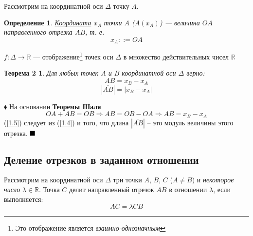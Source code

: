 \documentclass[a4paper, 12pt]{report}
\begin{document}
	Рассмотрим на координатной оси $\Delta$ точку $A$.
	\newtheorem*{Def2}{Определение}
	\begin{Def2}
		\underline{Координата} $x_A$ точки $A$ ($A(x_A)$) --- величина $OA$ направленного отрезка $\overline{AB}$, т. е. 
		\begin{equation}\label{1.3}
			x_A ::= OA \tag{3}
		\end{equation}
	\end{Def2}
	\quad{} $f: \Delta \longrightarrow \mathbb{R}$ --- отображение\footnote{Это отображение является \textit{взаимно-однозначным}} точек оси $\Delta$ в множество действительных чисел $\mathbb{R}$\\
	\newtheorem*{Th2}{Теорема 2}
	\begin{Th2}
		Для любых точек $A$ и $B$ координатной оси $\Delta$ верно:
		\begin{equation}\label{1.4}
			AB = x_B - x_A \tag{4}
		\end{equation}
		\begin{equation}\label{1.5}
			|\overline{AB}| = |x_B - x_A| \tag{5}
		\end{equation}
	\end{Th2}
	$\blacklozenge$ \quad{} На основании \textbf{Теоремы Шаля}\\
	$$OA + AB = OB \Rightarrow AB = OB - OA \Rightarrow AB = x_B - x_A$$
	(\ref{1.5}) следует из (\ref{1.4}) и того, что длина $|\overline{AB}|$ -- это модуль величины этого отрезка.
	$\hfill\blacksquare$
	
	\subsection*{Деление отрезков в заданном отношении}
	\quad{} Рассмотрим на координатной оси $\Delta$ три точки $A$, $B$, $C$ ($A \ne B$) и \textit{некоторое число} $\lambda \in \mathbb{R}$. Точка $C$ делит направленный отрезок $\overline{AB}$ в отношении $\lambda$, если выполняется: 
	\begin{equation}\label{1.6}
		AC = \lambda CB \tag{6}
	\end{equation}
	
\end{document}
